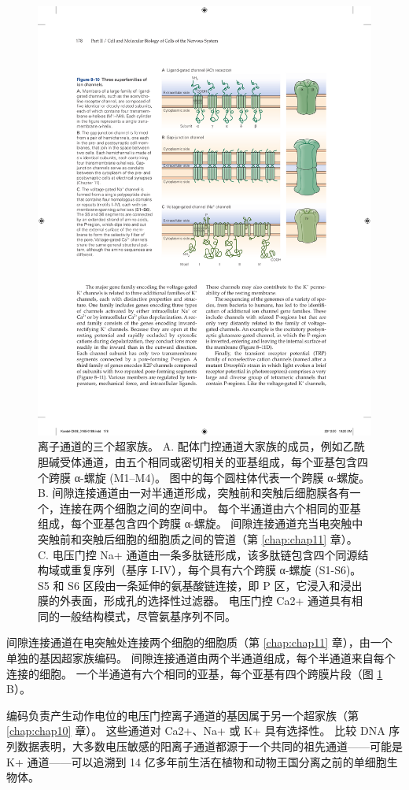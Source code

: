 \begin{figure}[htbp]
	\centering
	\includegraphics[width=0.7\linewidth]{chap08/fig_8_10}
	\caption{离子通道的三个超家族。 A. 配体门控通道大家族的成员，例如乙酰胆碱受体通道，由五个相同或密切相关的亚基组成，每个亚基包含四个跨膜 α-螺旋 (M1–M4)。 图中的每个圆柱体代表一个跨膜 α-螺旋。 B. 间隙连接通道由一对半通道形成，突触前和突触后细胞膜各有一个，连接在两个细胞之间的空间中。 每个半通道由六个相同的亚基组成，每个亚基包含四个跨膜 α-螺旋。 间隙连接通道充当电突触中突触前和突触后细胞的细胞质之间的管道（第 \ref{chap:chap11} 章）。 C. 电压门控 Na+ 通道由一条多肽链形成，该多肽链包含四个同源结构域或重复序列（基序 I-IV），每个具有六个跨膜 α-螺旋 (S1-S6)。 S5 和 S6 区段由一条延伸的氨基酸链连接，即 P 区，它浸入和浸出膜的外表面，形成孔的选择性过滤器。 电压门控 Ca2+ 通道具有相同的一般结构模式，尽管氨基序列不同。}
	\label{fig:8_10}
\end{figure}




间隙连接通道在电突触处连接两个细胞的细胞质（第 \ref{chap:chap11} 章），由一个单独的基因超家族编码。 
间隙连接通道由两个半通道组成，每个半通道来自每个连接的细胞。 
一个半通道有六个相同的亚基，每个亚基有四个跨膜片段（图 \ref{fig:8_10} B）。


编码负责产生动作电位的电压门控离子通道的基因属于另一个超家族（第 \ref{chap:chap10} 章）。 
这些通道对 Ca2+、Na+ 或 K+ 具有选择性。 
比较 DNA 序列数据表明，大多数电压敏感的阳离子通道都源于一个共同的祖先通道——可能是 K+ 通道——可以追溯到 14 亿多年前生活在植物和动物王国分离之前的单细胞生物体。


